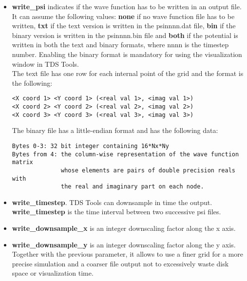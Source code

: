 \documentclass[a4paper,11pt]{article}
\begin{document}
\begin{itemize}
  \item \textbf{write\_psi} indicates if the wave function has to be written in an output file. It can assume the following values: \textbf{none} if no wave function file has to be written, \textbf{txt} if the text version is written in the psinnnn.dat file, \textbf{bin} if the binary version is written in the psinnnn.bin file and \textbf{both} if the potential is written in both the text and binary formats, where nnnn is the timestep number. Enabling the binary format is mandatory for using the visualization window in TDS Tools. \\
  The text file has one row for each internal point of the grid and the format is the following:
\begin{verbatim}
<X coord 1> <Y coord 1> (<real val 1>, <imag val 1>)
<X coord 2> <Y coord 2> (<real val 2>, <imag val 2>)
<X coord 3> <Y coord 3> (<real val 3>, <imag val 3>)
\end{verbatim}
The binary file has a little-endian format and has the following data:
\begin{verbatim}
Bytes 0-3: 32 bit integer containing 16*Nx*Ny
Bytes from 4: the column-wise representation of the wave function matrix
              whose elements are pairs of double precision reals with
              the real and imaginary part on each node.
\end{verbatim}

  \item \textbf{write\_timestep}. TDS Tools can downsample in time the output.
        \textbf{write\_timestep} is the time interval between two successive psi files.
  \item \textbf{write\_downsample\_x} is an integer downscaling factor along the x axis.
  \item \textbf{write\_downsample\_y} is an integer downscaling factor along the y axis. Together with the previous parameter, it allows to use a finer grid for a more precise simulation and a coarser file output not to excessively waste disk space or visualization time.
\end{itemize}
\end{document}
